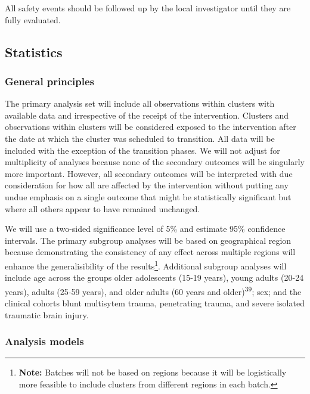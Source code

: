 \documentclass[
]{scrartcl}
\begin{document}
All safety events should be followed up by the local investigator until
they are fully evaluated.

\hypertarget{statistics}{%
\subsection{Statistics}\label{statistics}}

\hypertarget{general-principles}{%
\subsubsection{General principles}\label{general-principles}}

The primary analysis set will include all observations within clusters
with available data and irrespective of the receipt of the intervention.
Clusters and observations within clusters will be considered exposed to
the intervention after the date at which the cluster was scheduled to
transition. All data will be included with the exception of the
transition phases. We will not adjust for multiplicity of analyses
because none of the secondary outcomes will be singularly more
important. However, all secondary outcomes will be interpreted with due
consideration for how all are affected by the intervention without
putting any undue emphasis on a single outcome that might be
statistically significant but where all others appear to have remained
unchanged.

We will use a two-sided significance level of 5\% and estimate 95\%
confidence intervals. The primary subgroup analyses will be based on
geographical region because demonstrating the consistency of any effect
across multiple regions will enhance the generalisibility of the
results\footnote{\textbf{Note:} Batches will not be based on regions
  because it will be logistically more feasible to include clusters from
  different regions in each batch.}. Additional subgroup analyses will
include age across the groups older adolescents (15-19 years), young
adults (20-24 years), adults (25-59 years), and older adults (60 years
and older)\textsuperscript{39}; sex; and the clinical cohorts blunt
multisytem trauma, penetrating trauma, and severe isolated traumatic
brain injury.

\hypertarget{analysis-models}{%
\subsubsection{Analysis models}\label{analysis-models}}
\end{document}
